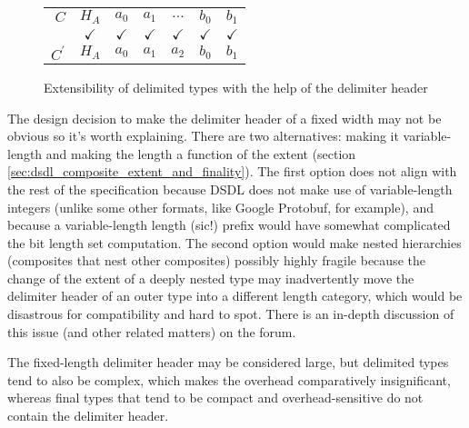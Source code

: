\begin{remark}
    \begin{figure}[H]
        \centering
        \begin{tabular}{r c c c c c c}
            \cline{2-7}
            $C$ &
            \multicolumn{1}{|c|}{$H_A$} & \multicolumn{1}{c|}{$a_0$} & \multicolumn{1}{c|}{$a_1$}
            &\multicolumn{1}{c|}{\footnotesize{$\ldots$}}
            &\multicolumn{1}{c|}{$b_0$} & \multicolumn{1}{c|}{$b_1$}
            \\\cline{2-7}
            & $\checkmark$ & $\checkmark$ & $\checkmark$ & $\checkmark$ & $\checkmark$ & $\checkmark$ \\
            \cline{2-7}
            $C^\prime$ &
            \multicolumn{1}{|c|}{$H_A$} & \multicolumn{1}{c|}{$a_0$} & \multicolumn{1}{c|}{$a_1$} &
            \multicolumn{1}{c|}{$a_2$}
            &\multicolumn{1}{c|}{$b_0$} & \multicolumn{1}{c|}{$b_1$}
            \\\cline{2-7}
        \end{tabular}
        \caption{Extensibility of delimited types with the help of the delimiter header}
        \label{fig:dsdl_non_final_extensibility}
    \end{figure}

    The design decision to make the delimiter header of a fixed width may not be obvious so it's worth explaining.
    There are two alternatives: making it variable-length and making the length a function of the extent
    (section \ref{sec:dsdl_composite_extent_and_finality}).
    The first option does not align with the rest of the specification because DSDL does not make use of
    variable-length integers (unlike some other formats, like Google Protobuf, for example),
    and because a variable-length length {\footnotesize{(sic!)}} prefix would have somewhat complicated the
    bit length set computation.
    The second option would make nested hierarchies (composites that nest other composites) possibly highly fragile
    because the change of the extent of a deeply nested type may inadvertently move the delimiter header of an
    outer type into a different length category, which would be disastrous for compatibility and hard to spot.
    There is an in-depth discussion of this issue (and other related matters) on the forum.

    The fixed-length delimiter header may be considered large,
    but delimited types tend to also be complex, which makes the overhead comparatively insignificant,
    whereas final types that tend to be compact and overhead-sensitive do not contain the delimiter header.
\end{remark}

